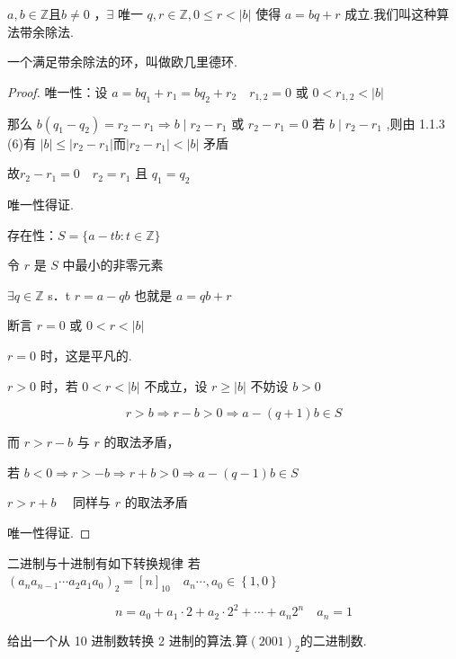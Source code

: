 \begin{theorem}
	$a, b \in \mathbb{Z}\textbf{且} b \neq 0$ ，$\exists$ 唯一 $q, r \in \mathbb{Z}, 0 \leq r<|b|$ 使得 $a=b q+r$
	成立.我们叫这种算法带余除法.
	
\end{theorem}
\label{p1:concept:c1-l197}一个满足带余除法的环，叫做欧几里德环.
\begin{proof}
	唯一性：设 $a=b q_1+r_1=b q_2+r_2 \quad r_{1,2}=0$ 或 $0<r_{1,2}<|b|$
	
	那么 $b\left(q_1-q_2\right)=r_2-r_1 \Rightarrow b \mid r_2-r_1$ 或 $r_2-r_1=0$
	若 $b \mid r_2-r_1$ ,则由 1.1.3 (6)有 $|b| \leqslant\left|r_2-r_1\right|$而$\left|r_2-r_1\right|<|b|$ 矛盾
	
	故$r_2-r_1=0 \quad r_2=r_1$ 且 $q_1=q_2 \quad$ 
	
	唯一性得证.
	
	存在性：$S=\{a-t b: t \in \mathbb{Z}\}$
	
	令 $r$ 是 $S$ 中最小的非零元素
	
	$\exists q \in \mathbb{Z}$ s．t $r=a-q b$ 也就是 $a=q b+r$
	
	
	断言 $r=0$ 或 $0<r<|b|$
	
	
	$r=0$ 时，这是平凡的.
	
	$r>0$ 时，若 $0<r<|b|$ 不成立，设 $r \geqslant|b|$ 不妨设 $b>0$
	
	$$
	r>b \Rightarrow r-b>0 \Rightarrow a-(q+1) b \in S
	$$
	
	
	而 $r>r-b$ 与 $r$ 的取法矛盾，
	
	若 $b<0 \Rightarrow r>-b \Rightarrow r+b>0 \Rightarrow a-(q-1) b \in S$
	
	$r>r+b \quad$ 同样与 $r$ 的取法矛盾
	
	唯一性得证.
\end{proof}
\begin{problem}
	二进制与十进制有如下转换规律
	若 $\left(a_n a_{n-1} \cdots a_2 a_1 a_0\right)_2=[n]_{10} \quad a_n \cdots, a_0 \in\left\{1,0\right\}$
	
	$$
	n=a_0+a_1 \cdot 2+a_2 \cdot 2^2+\cdots+a_n 2^n \quad a_n=1
	$$
	
	
	给出一个从 10 进制数转换 2 进制的算法.算$(2001)_{2}$的二进制数.
	
	
\end{problem}
